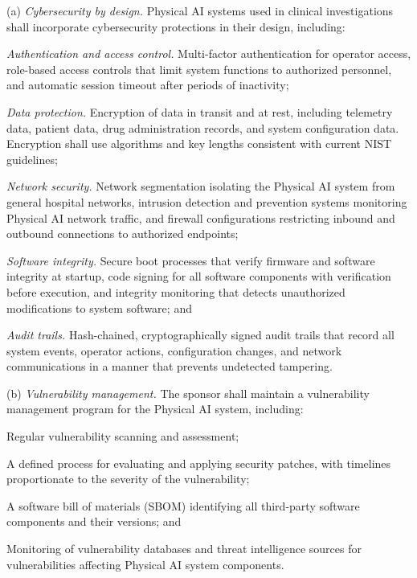 (a) \textit{Cybersecurity by design.} Physical AI systems used in clinical investigations shall incorporate cybersecurity protections in their design, including:

\begin{description}[leftmargin=0.8cm,style=sameline]
\item[(1)] \textit{Authentication and access control.} Multi-factor authentication for operator access, role-based access controls that limit system functions to authorized personnel, and automatic session timeout after periods of inactivity;
\item[(2)] \textit{Data protection.} Encryption of data in transit and at rest, including telemetry data, patient data, drug administration records, and system configuration data. Encryption shall use algorithms and key lengths consistent with current NIST guidelines;
\item[(3)] \textit{Network security.} Network segmentation isolating the Physical AI system from general hospital networks, intrusion detection and prevention systems monitoring Physical AI network traffic, and firewall configurations restricting inbound and outbound connections to authorized endpoints;
\item[(4)] \textit{Software integrity.} Secure boot processes that verify firmware and software integrity at startup, code signing for all software components with verification before execution, and integrity monitoring that detects unauthorized modifications to system software; and
\item[(5)] \textit{Audit trails.} Hash-chained, cryptographically signed audit trails that record all system events, operator actions, configuration changes, and network communications in a manner that prevents undetected tampering.
\end{description}

(b) \textit{Vulnerability management.} The sponsor shall maintain a vulnerability management program for the Physical AI system, including:

\begin{description}[leftmargin=0.8cm,style=sameline]
\item[(1)] Regular vulnerability scanning and assessment;
\item[(2)] A defined process for evaluating and applying security patches, with timelines proportionate to the severity of the vulnerability;
\item[(3)] A software bill of materials (SBOM) identifying all third-party software components and their versions; and
\item[(4)] Monitoring of vulnerability databases and threat intelligence sources for vulnerabilities affecting Physical AI system components.
\end{description}

